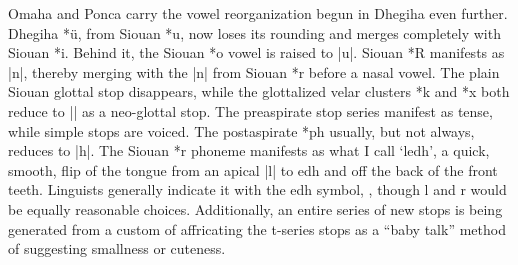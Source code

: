 \documentclass[output=paper]{LSP/langsci}
\begin{document}

Omaha and Ponca carry the vowel reorganization begun in Dhegiha even further.  Dhegiha *\"u, from Siouan *u, now loses its rounding and merges completely with Siouan *i.  Behind it, the Siouan *o vowel is raised to |u|.  Siouan *R manifests as |n|, thereby merging with the |n| from Siouan *r before a nasal vowel.  The plain Siouan glottal stop disappears, while the glottalized velar clusters *k\textsuperscript{} and *x\textsuperscript{} both reduce to |\textsuperscript{}| as a neo-glottal stop.  The preaspirate stop series manifest as tense, while simple stops are voiced.  The postaspirate *ph usually, but not always, reduces to |h|.  The Siouan *r phoneme manifests as what I call `ledh', a quick, smooth, flip of the tongue from an apical |l| to edh and off the back of the front teeth.  Linguists generally indicate it with the edh symbol, , though l and r would be equally reasonable choices.  Additionally, an entire series of new stops is being generated from a custom of affricating the t-series stops as a ``baby talk'' method of suggesting smallness or cuteness.
\end{document}
